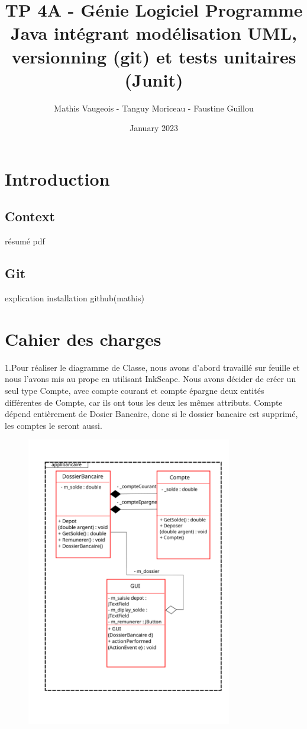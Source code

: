 \documentclass{article}
\title{TP 4A - Génie Logiciel
Programme Java intégrant modélisation UML, versionning (git)
et tests unitaires (Junit)
}
\author{Mathis Vaugeois - Tanguy Moriceau -  Faustine Guillou}
\date{January 2023}
\begin{document}
\maketitle
\tableofcontents

\newpage
\section{Introduction}

\subsection{Context}
résumé pdf
\subsection{Git}
explication installation github(mathis)
\newpage
\section{Cahier des charges}



1.Pour réaliser le diagramme de Classe, nous avons d'abord travaillé sur feuille et nous l'avons mis au prope en utilisant InkScape. 
Nous avons décider de créer un seul type Compte, avec compte courant et compte épargne deux entités différentes de Compte, car ils ont tous les deux les mêmes attributs.
Compte dépend entièrement de Dosier Bancaire, donc si le dossier bancaire est supprimé, les comptes le seront aussi.
\begin{figure}[h]
\includegraphics[width=0.8\textwidth]{diagrammeClasse.png}
\end{figure}
\newline
\newpage
\end{document}
